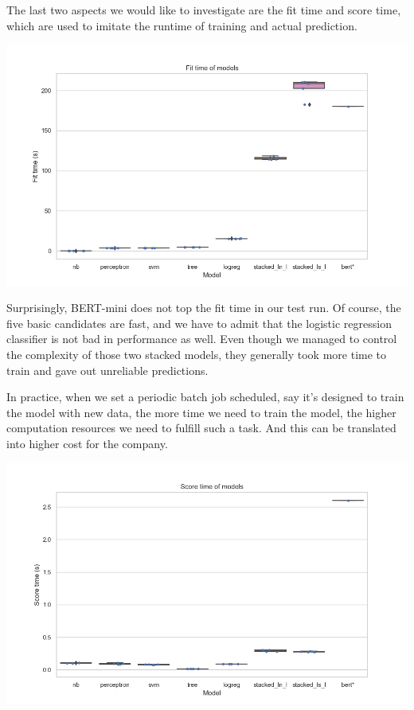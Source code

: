 \documentclass[
]{kaohandt}
\begin{document}
The last two aspects we would like to investigate are the fit time and score time, which are used to imitate the runtime of training and actual prediction.

\includegraphics[]{metric_fit_time.png}

Surprisingly, BERT-mini does not top the fit time in our test run. Of course, the five basic candidates are fast, and we have to admit that the logistic regression classifier is not bad in performance as well. Even though we managed to control the complexity of those two stacked models, they generally took more time to train and gave out unreliable predictions.

In practice, when we set a periodic batch job scheduled, say it’s designed to train the model with new data, the more time we need to train the model, the higher computation resources we need to fulfill such a task. And this can be translated into higher cost for the company.

\includegraphics[]{metric_score_time.png}
\end{document}
